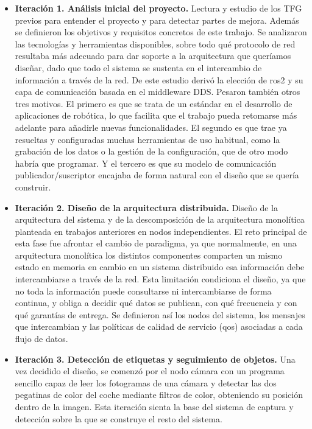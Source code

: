 \begin{itemize}

    \item \textbf{Iteración 1. Análisis inicial del proyecto.} Lectura y estudio de los TFG previos para entender el proyecto y para detectar partes de mejora. Además se definieron los objetivos y requisitos concretos de este trabajo. Se analizaron las tecnologías y herramientas disponibles, sobre todo qué protocolo de red resultaba más adecuado para dar soporte a la arquitectura que queríamos diseñar, dado que todo el sistema se sustenta en el intercambio de información a través de la red. De este estudio derivó la elección de \gls{ros2} y su capa de comunicación basada en el middleware DDS. Pesaron también otros tres motivos. El primero es que se trata de un estándar en el desarrollo de aplicaciones de robótica, lo que facilita que el trabajo pueda retomarse más adelante para añadirle nuevas funcionalidades. El segundo es que trae ya resueltas y configuradas muchas herramientas de uso habitual, como la grabación de los datos o la gestión de la configuración, que de otro modo habría que programar. Y el tercero es que su modelo de comunicación publicador/suscriptor encajaba de forma natural con el diseño que se quería construir.

    \item \textbf{Iteración 2. Diseño de la arquitectura distribuida.} Diseño de la arquitectura del sistema y de la descomposición de la arquitectura monolítica planteada en trabajos anteriores en nodos independientes. El reto principal de esta fase fue afrontar el cambio de paradigma, ya que normalmente, en una arquitectura monolítica los distintos componentes comparten un mismo estado en memoria en cambio en un sistema distribuido esa información debe intercambiarse a través de la red. Esta limitación condiciona el diseño, ya que no toda la información puede consultarse ni intercambiarse de forma continua, y obliga a decidir qué datos se publican, con qué frecuencia y con qué garantías de entrega. Se definieron así los nodos del sistema, los mensajes que intercambian y las políticas de calidad de servicio (\gls{qos}) asociadas a cada flujo de datos.

    \item \textbf{Iteración 3. Detección de etiquetas y seguimiento de objetos.} Una vez decidido el diseño, se comenzó por el nodo cámara con un programa sencillo capaz de leer los fotogramas de una cámara y detectar las dos pegatinas de color del coche mediante filtros de color, obteniendo su posición dentro de la imagen. Esta iteración sienta la base del sistema de captura y detección sobre la que se construye el resto del sistema.


\end{itemize}
